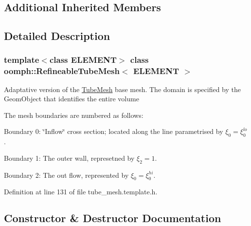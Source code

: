 \subsection*{Additional Inherited Members}


\subsection{Detailed Description}
\subsubsection*{template$<$class E\+L\+E\+M\+E\+NT$>$\newline
class oomph\+::\+Refineable\+Tube\+Mesh$<$ E\+L\+E\+M\+E\+N\+T $>$}

Adaptative version of the \hyperlink{classoomph_1_1TubeMesh}{Tube\+Mesh} base mesh. The domain is specified by the Geom\+Object that identifies the entire volume

The mesh boundaries are numbered as follows\+:
\begin{DoxyItemize}
\item Boundary 0\+: \char`\"{}\+Inflow\char`\"{} cross section; located along the line parametrised by $ \xi_0 = \xi_0^{lo} $.
\item Boundary 1\+: The outer wall, represetned by $\xi_2 = 1$.
\item Boundary 2\+: The out flow, represented by $\xi_0 = \xi_0^{hi}$. 
\end{DoxyItemize}

Definition at line 131 of file tube\+\_\+mesh.\+template.\+h.



\subsection{Constructor \& Destructor Documentation}
\mbox{\label{classoomph_1_1RefineableTubeMesh_a0b8e2307c2d4594196f78a6278d9bbf7}} 
